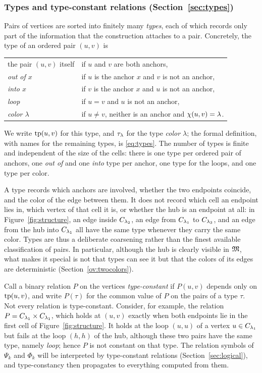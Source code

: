 \subsubsection{Types and type-constant relations (Section~\ref{sec:types})}\label{ov:types}
Pairs of vertices are sorted into finitely many \emph{types}, each of which
records only part of the information that the construction attaches to a
pair.
Concretely, the type of an ordered pair $(u,v)$ is
\begin{center}
\renewcommand{\arraystretch}{1.1}
\begin{tabular}{@{}ll@{}}
\toprule
the pair $(u,v)$ itself&if $u$ and $v$ are both anchors,\\
\emph{out of $x$}&if $u$ is the anchor $x$ and $v$ is not an anchor,\\
\emph{into $x$}&if $v$ is the anchor $x$ and $u$ is not an anchor,\\
\emph{loop}&if $u=v$ and $u$ is not an anchor,\\
\emph{color $\lambda$}&if $u\ne v$, neither is an anchor and $\chi(u,v)=\lambda$.\\
\bottomrule
\end{tabular}
\end{center}
We write $\operatorname{tp}(u,v)$ for this type, and $\tau_{\lambda}$ for the type
\emph{color $\lambda$}; the formal definition, with names for the remaining
types, is \eqref{eq:types}. The number of types is finite and independent
of the size of the cells: there is one type per ordered pair of anchors, one
\emph{out of} and one \emph{into} type per anchor, one type for the loops,
and one type per color.

A type records which anchors are involved, whether the two endpoints
coincide, and the color of the edge between them. It does not record which
cell an endpoint lies in, which vertex of that cell it is, or whether the
hub is an endpoint at all: in Figure~\ref{fig:structure}, an edge inside
$C_{\lambda_2}$, an edge from $C_{\lambda_1}$ to $C_{\lambda_3}$,
and an edge from the hub into $C_{\lambda_1}$ all have the same type
whenever they carry the same color. Types are thus a deliberate coarsening
rather than the finest available classification of pairs. In particular,
although the hub is clearly visible in $\mathfrak M$, what makes it special is not
that types can see it but that the colors of its edges are deterministic
(Section~\ref{ov:twocolors}).

Call a binary relation $P$ on the vertices \emph{type-constant} if $P(u,v)$
depends only on $\operatorname{tp}(u,v)$, and write $P(\tau)$ for the common value of $P$
on the pairs of a type $\tau$. Not every relation is type-constant.
Consider, for example, the relation
$P=C_{\lambda_1}\times C_{\lambda_1}$, which holds at $(u,v)$ exactly
when both endpoints lie in the first cell of Figure~\ref{fig:structure}. It
holds at the loop $(u,u)$ of a vertex $u\in C_{\lambda_1}$ but fails at
the loop $(h,h)$ of the hub, although these two pairs have the same type,
namely \emph{loop}; hence $P$ is not constant on that type. The relation
symbols of $\Psi_k$ and $\Phi_k$ will be interpreted by type-constant
relations (Section~\ref{sec:logical}), and type-constancy then propagates
to everything computed from them.

